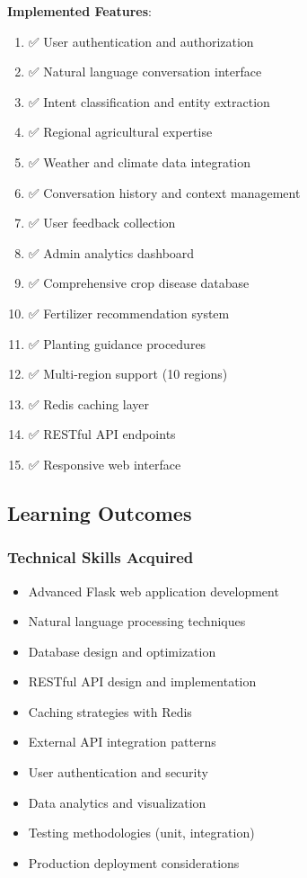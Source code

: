 \documentclass[12pt,a4paper]{article}
\begin{document}
\textbf{Implemented Features}:
\begin{enumerate}[leftmargin=*]
    \item ✅ User authentication and authorization
    \item ✅ Natural language conversation interface
    \item ✅ Intent classification and entity extraction
    \item ✅ Regional agricultural expertise
    \item ✅ Weather and climate data integration
    \item ✅ Conversation history and context management
    \item ✅ User feedback collection
    \item ✅ Admin analytics dashboard
    \item ✅ Comprehensive crop disease database
    \item ✅ Fertilizer recommendation system
    \item ✅ Planting guidance procedures
    \item ✅ Multi-region support (10 regions)
    \item ✅ Redis caching layer
    \item ✅ RESTful API endpoints
    \item ✅ Responsive web interface
\end{enumerate}

\subsection{Learning Outcomes}

\subsubsection{Technical Skills Acquired}

\begin{itemize}[leftmargin=*]
    \item Advanced Flask web application development
    \item Natural language processing techniques
    \item Database design and optimization
    \item RESTful API design and implementation
    \item Caching strategies with Redis
    \item External API integration patterns
    \item User authentication and security
    \item Data analytics and visualization
    \item Testing methodologies (unit, integration)
    \item Production deployment considerations
\end{itemize}
\end{document}
